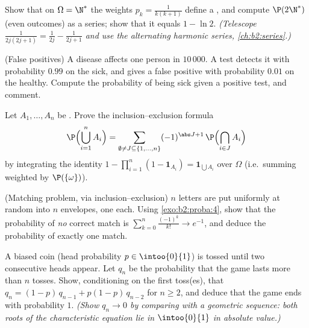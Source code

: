 \begin{exercise}[$\star$]\label{exo:b2:proba:2}
Show that on $\Omega = \N^*$ the weights $p_k = \frac{1}{k(k+1)}$
define a , and compute $\P(2\N^*)$ (even
outcomes) as a series; show that it equals $1 - \ln 2$.
\emph{(Telescope $\frac{1}{2j(2j+1)} = \frac{1}{2j} -
\frac{1}{2j+1}$ and use the alternating harmonic series,
\cref{ch:b2:series}.)}
\end{exercise}

\begin{exercise}[$\star$]\label{exo:b2:proba:3}
(False positives) A disease affects one person in $10\,000$. A
test detects it with probability $0.99$ on the sick, and gives a
false positive with probability $0.01$ on the healthy. Compute
the probability of being sick given a positive test, and comment.
\end{exercise}

\begin{exercise}[$\star\star$]\label{exo:b2:proba:4}
Let $A_1, \dots, A_n$ be . Prove the inclusion--exclusion
formula
\[
\P\Bigl(\bigcup_{i=1}^n A_i\Bigr)
= \sum_{\emptyset \neq J \subseteq \{1,\dots,n\}}
(-1)^{\abs J + 1}\,\P\Bigl(\bigcap_{i \in J}A_i\Bigr)
\]
by integrating the identity $1 - \prod_{i=1}^n(1 -
\mathbf{1}_{A_i}) = \mathbf{1}_{\bigcup A_i}$ over $\Omega$
(i.e.\ summing weighted by $\P(\{\omega\})$).
\end{exercise}

\begin{exercise}[$\star\star$]\label{exo:b2:proba:5}
(Matching problem, via inclusion--exclusion) $n$ letters are put
uniformly at random into $n$ envelopes, one each. Using
\cref{exo:b2:proba:4}, show that the probability of \emph{no}
correct match is $\sum_{k=0}^n \frac{(-1)^k}{k!} \to e^{-1}$, and
deduce the probability of exactly one match.
\end{exercise}

\begin{exercise}[$\star\star$]\label{exo:b2:proba:6}
A biased coin (head probability $p \in \intoo{0}{1}$) is tossed
until two consecutive heads appear. Let $q_n$ be the probability
that the game lasts more than $n$ tosses. Show, conditioning on
the first toss(es), that $q_n = (1-p)\,q_{n-1} + p(1-p)\,q_{n-2}$
for $n \geq 2$, and deduce that the game ends with probability
$1$. \emph{(Show $q_n \to 0$ by comparing with a geometric
sequence: both roots of the characteristic equation lie in
$\intoo{0}{1}$ in absolute value.)}
\end{exercise}

